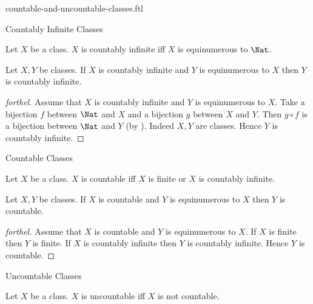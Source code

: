 \documentclass{naproche-library}
\begin{document}
\begin{smodule}[title=Countable and Uncountable Classes]{countable-and-uncountable-classes.ftl}

\begin{sfragment}{Countably Infinite Classes}
  \begin{definition}[forthel,id=FOUNDATIONS_14_6249029537103872]
    Let $X$ be a class.
    $X$ is countably infinite iff $X$ is equinumerous to $\Nat$.
  \end{definition}

  \begin{proposition}[forthel,id=FOUNDATIONS_14_803449379749888]
    Let $X, Y$ be classes.
    If $X$ is countably infinite and $Y$ is equinumerous to $X$ then $Y$ is countably infinite.
  \end{proposition}
  \begin{proof}[forthel]
    Assume that $X$ is countably infinite and $Y$ is equinumerous to $X$.
    Take a bijection $f$ between $\Nat$ and $X$ and a bijection $g$ between $X$ and $Y$.
    Then $g \circ f$ is a bijection between $\Nat$ and $Y$ (by ).
    Indeed $X, Y$ are classes.
    Hence $Y$ is countably infinite.
  \end{proof}
\end{sfragment}

\begin{sfragment}{Countable Classes}
  \begin{definition}[forthel,id=FOUNDATIONS_14_5412969443753984]
    Let $X$ be a class.
    $X$ is countable iff $X$ is finite or $X$ is countably infinite.
  \end{definition}

  \begin{proposition}[forthel,id=FOUNDATIONS_14_4182588499427328]
    Let $X, Y$ be classes.
    If $X$ is countable and $Y$ is equinumerous to $X$ then $Y$ is countable.
  \end{proposition}
  \begin{proof}[forthel]
    Assume that $X$ is countable and $Y$ is equinumerous to $X$.
    If $X$ is finite then $Y$ is finite.
    If $X$ is countably infinite then $Y$ is countably infinite.
    Hence $Y$ is countable.
  \end{proof}
\end{sfragment}

\begin{sfragment}{Uncountable Classes}
  \begin{definition}[forthel,id=FOUNDATIONS_14_2411928395710464]
    Let $X$ be a class.
    $X$ is uncountable iff $X$ is not countable.
  \end{definition}


\end{sfragment}
\end{smodule}
\end{document}
